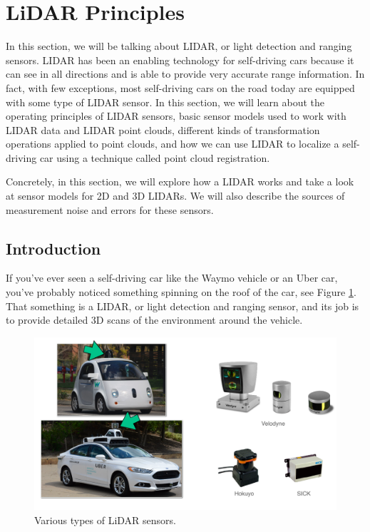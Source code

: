 \section{LiDAR Principles}
\label{lidar_principles}

In this section, we will be talking about LIDAR, or light detection and ranging sensors. LIDAR has been an enabling technology
for self-driving cars because it can see in all directions and is able to provide very accurate range information. 
In fact, with few exceptions, most self-driving cars on the road today are equipped with some type of LIDAR sensor. 
In this section, we will learn about the operating principles of LIDAR sensors, basic sensor models used to work with LIDAR data and LIDAR point clouds, different kinds of transformation
operations applied to point clouds, and how we can use LIDAR to localize a self-driving car using a technique
called point cloud registration. 

Concretely, in this section, we will explore how a LIDAR works and take a look at sensor models
for 2D and 3D LIDARs. We will also describe the sources of measurement noise and
errors for these sensors. 

\subsection{Introduction}

If you've ever seen
a self-driving car like the Waymo vehicle or an Uber car, you've probably noticed something
spinning on the roof of the car, see Figure \ref{lidar_1}. That something is a LIDAR, or light detection and ranging sensor, and its job is to provide detailed 3D scans of
the environment around the vehicle. 

\begin{figure}[!htb]
\begin{center}
\includegraphics[scale=0.280]{img/hardware/lidar_1.jpeg}
\end{center}
\caption{Various types of LiDAR sensors.}
\label{lidar_1}
\end{figure}


